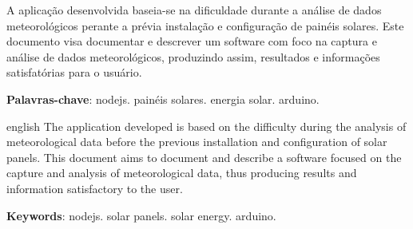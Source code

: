 
\setlength{\absparsep}{18pt} %
\begin{resumo}
  A aplicação desenvolvida baseia-se na dificuldade durante a análise de dados meteorológicos perante a prévia instalação e configuração de painéis solares. Este documento visa documentar e descrever um software com foco na captura e análise de dados meteorológicos, produzindo assim, resultados e informações satisfatórias para o usuário.

 \textbf{Palavras-chave}: nodejs. painéis solares. energia solar. arduino.
\end{resumo}

\begin{resumo}[Abstract]
 \begin{otherlanguage*}{english}
  The application developed is based on the difficulty during the analysis of meteorological data before the previous installation and configuration of solar panels. This document aims to document and describe a software focused on the capture and analysis of meteorological data, thus producing results and information satisfactory to the user.

   \vspace{\onelineskip}

   \noindent
   \textbf{Keywords}: nodejs. solar panels. solar energy. arduino.
 \end{otherlanguage*}
\end{resumo}
